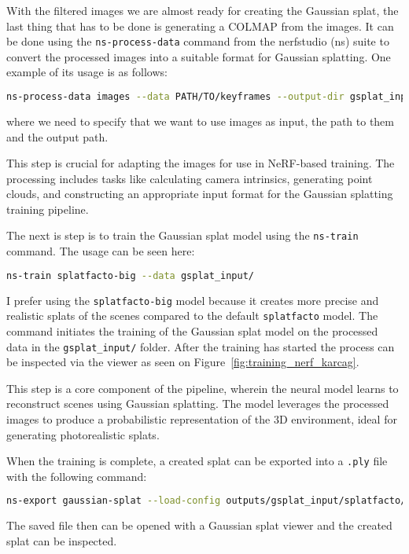 With the filtered images we are almost ready for creating the Gaussian splat, the last thing that has to be done is generating a COLMAP from the images. It can be done using the \verb|ns-process-data| command from the nerfstudio (ns) suite to convert the processed images into a suitable format for Gaussian splatting. One example of its usage is as follows:

\FloatBarrier
\begin{lstlisting}[language=bash,frame=single,float=!ht]
ns-process-data images --data PATH/TO/keyframes --output-dir gsplat_input/
\end{lstlisting}
\FloatBarrier
where we need to specify that we want to use images as input, the path to them and the output path.

This step is crucial for adapting the images for use in NeRF-based training. The processing includes tasks like calculating camera intrinsics, generating point clouds, and constructing an appropriate input format for the Gaussian splatting training pipeline.

The next is step is to train the Gaussian splat model using the \verb|ns-train| command. The usage can be seen here:
\FloatBarrier
\begin{lstlisting}[language=bash,frame=single,float=!ht]
ns-train splatfacto-big --data gsplat_input/
\end{lstlisting}
\FloatBarrier

I prefer using the \verb|splatfacto-big| model because it creates more precise and realistic splats of the scenes compared to the default \verb|splatfacto| model. The command initiates the training of the Gaussian splat model on the processed data in the \verb|gsplat_input/| folder. After the training has started the process can be inspected via the viewer as seen on Figure~\ref{fig:training_nerf_karcag}.

This step is a core component of the pipeline, wherein the neural model learns to reconstruct scenes using Gaussian splatting. The model leverages the processed images to produce a probabilistic representation of the 3D environment, ideal for generating photorealistic splats.

When the training is complete, a created splat can be exported into a \verb|.ply| file with the following command:
\FloatBarrier
\begin{lstlisting}[language=bash,frame=single,float=!ht]
ns-export gaussian-splat --load-config outputs/gsplat_input/splatfacto/DATE/config.yml --output-dir exports/splat/\end{lstlisting}
\FloatBarrier
The saved file then can be opened with a Gaussian splat viewer and the created splat can be inspected.
